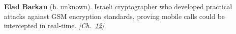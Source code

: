 \textbf{Elad Barkan} (b. unknown). Israeli cryptographer who developed practical attacks against GSM encryption standards, proving mobile calls could be intercepted in real-time. \emph{[Ch.~\hyperref[ch:gsmencryptionorder]{12}]}


